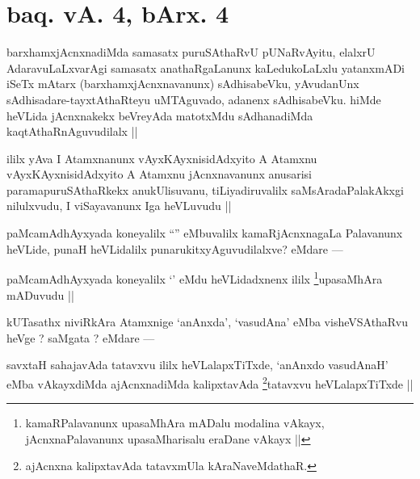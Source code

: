 \section*{baq. vA. 4, bArx. 4}


\begin{artha}
barxhamxjAcnxnadiMda samasatx puruSAthaRvU pUNaRvAyitu, elalxrU AdaravuLaLxvarAgi samasatx anathaRgaLanunx kaLedukoLaLxlu yatanxmADi iSeTx mAtarx (barxhamxjAcnxnavanunx) sAdhisabeVku, yAvudanUnx sAdhisadare-tayxtAthaRteyu uMTAguvado, adanenx sAdhisabeVku. hiMde heVLida jAcnxnakekx beVreyAda matotxMdu sAdhanadiMda kaqtAthaRnAguvudilalx ||
\end{artha}



\begin{artha}
ililx yAva I Atamxnanunx vAyxKAyxnisidAdxyito A Atamxnu vAyxKAyxnisidAdxyito A Atamxnu jAcnxnavanunx anusarisi paramapuruSAthaRkekx anukUlisuvanu, tiLiyadiruvalilx saMsAradaPalakAkxgi nilulxvudu, I viSayavanunx Iga heVLuvudu ||
\end{artha}

\begin{artha}
paMcamAdhAyxyada koneyalilx ``\stext'' eMbuvalilx kamaRjAcnxnagaLa Palavanunx heVLide, punaH heVLidalilx punarukitxyAguvudilalxve? eMdare ---
\end{artha}

\begin{artha}
paMcamAdhAyxyada koneyalilx `\stext' eMdu heVLidadxnenx ililx \footnote{kamaRPalavanunx upasaMhAra mADalu modalina vAkayx, jAcnxnaPalavanunx upasaMharisalu eraDane vAkayx ||}upasaMhAra mADuvudu ||
\end{artha}

\begin{artha}
kUTasathx niviRkAra Atamxnige `anAnxda', `vasudAna' eMba visheVSAthaRvu heVge ? saMgata ? eMdare ---
\end{artha}

\begin{artha}
savxtaH sahajavAda tatavxvu ililx heVLalapxTiTxde, `anAnxdo vasudAnaH' eMba vAkayxdiMda ajAcnxnadiMda kalipxtavAda \footnote{ajAcnxna kalipxtavAda tatavxmUla kAraNaveMdathaR.}tatavxvu heVLalapxTiTxde ||
\end{artha}


